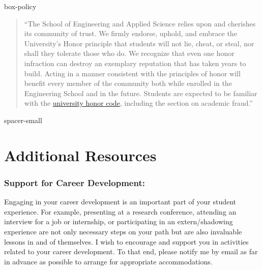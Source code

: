 \documentclass[11pt, a4paper]{article}
\begin{document}
\begin{BlockClass}{box-policy}
\begin{quote}
``The School of Engineering and Applied Science relies upon and cherishes its community of trust. We firmly endorse, uphold, and embrace the University’s Honor principle that students will not lie, cheat, or steal, nor shall they tolerate those who do. We recognize that even one honor infraction can destroy an exemplary reputation that has taken years to build. Acting in a manner consistent with the principles of honor will benefit every member of the community both while enrolled in the Engineering School and in the future. Students are expected to be familiar with the \href{http://honor.virginia.edu/academic-fraud}{university honor code}, including the section on academic fraud.''
\end{quote}

\end{BlockClass}

\begin{BlockClass}{spacer-small}
	\vspace{10pt}
\end{BlockClass}

\section*{Additional Resources}

\subsubsection*{Support for Career Development:}
Engaging in your career development is an important part of your student experience. For example, presenting at a research conference, attending an interview for a job or internship, or participating in an extern/shadowing experience are not only necessary steps on your path but are also invaluable lessons in and of themselves. I wish to encourage and support you in activities related to your career development. To that end, please notify me by email as far in advance as possible to arrange for appropriate accommodations.
\end{document}
